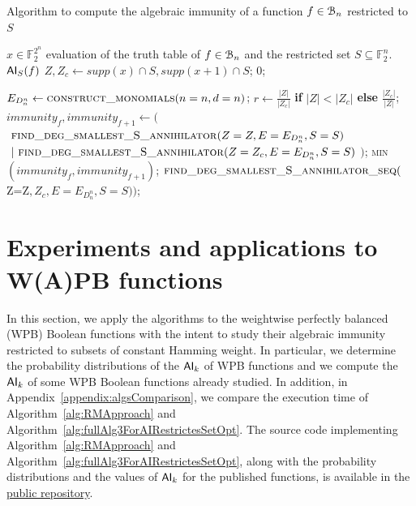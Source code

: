 \documentclass[11pt]{llncs}
\begin{document}
\begin{algorithm}[H]
	\small
	\caption{Algorithm to compute the algebraic immunity of a function $f\in \mathcal{B}_{n}$ restricted to $S$}\label{alg:fullAlg3ForAIRestrictesSetOpt}
	\begin{algorithmic}[1]
		\Require $x\in \mathbb{F}_2^{2^n}$ evaluation of the truth table of $f\in \mathcal{B}_{n}$ and the restricted set $S\subseteq \mathbb{F}_2^n$.
		\Ensure $\mathsf{AI}_S(f)$
		\State $Z, Z_c \gets supp(x)\cap S, supp(x+1) \cap S$;
		 	\Return $0$; \EndIf
		
		\State $E_{D_n^n} \leftarrow \mbox{\textsc{construct\_monomials}}(n=n, d=n)$\footnotemark;
		\State $r\gets \frac{|Z|}{|Z_c|}$ \textbf{if} $|Z| < |Z_c|$ \textbf{else} $\frac{|Z_c|}{|Z|}$;
		\State $immunity_f, immunity_{f+1} \leftarrow ($\\
		$\ \mbox{\textsc{find\_deg\_smallest\_S\_annihilator}}(Z=Z, E=E_{D_n^n}, S=S)$\\
		$\ |\ \mbox{\textsc{find\_deg\_smallest\_S\_annihilator}}(Z=Z_c, E=E_{D_n^n}, S=S)$ $)$;
		\State \Return \textsc{min}$\left(immunity_f, immunity_{f+1}\right)$;
		\Else
		\State \Return $\mbox{\textsc{find\_deg\_smallest\_S\_annihilator\_seq}}($Z=Z$, Z_c, E=E_{D_n^n}, S=S))$\footnotemark;
		\EndIf
	\end{algorithmic}
\end{algorithm}


\section{Experiments and applications to W(A)PB functions}\label{sec:experiments}
In this section, we apply the algorithms to the weightwise perfectly balanced (WPB) Boolean functions with the intent to study their algebraic immunity restricted to subsets of constant Hamming weight. In particular, we determine the probability distributions of the $\mathsf{AI}_{k}$ of WPB functions and we compute the $\mathsf{AI}_{k}$ of some WPB Boolean functions already studied. In addition, in Appendix~\ref{appendix:algsComparison}, we compare the execution time of Algorithm~\ref{alg:RMApproach} and Algorithm~\ref{alg:fullAlg3ForAIRestrictesSetOpt}.
The source code implementing Algorithm~\ref{alg:RMApproach} and Algorithm~\ref{alg:fullAlg3ForAIRestrictesSetOpt}, along with the probability distributions and the values of $\mathsf{AI}_{k}$ for the published functions, is available in the
\href{https://github.com/LucaBonamino/restricted_algebraic_immunity}{public repository}.
\end{document}
